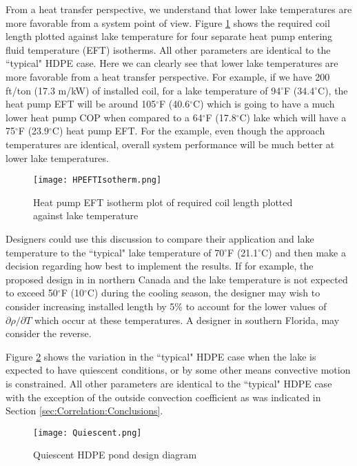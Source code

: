 From a heat transfer perspective, we understand that lower lake temperatures are more favorable from a system point of view. Figure \ref{fig:DesignTools:SpcCooling:HPEFTIsotherm} shows the required coil length plotted against lake temperature for four separate heat pump entering fluid temperature (EFT) isotherms. All other parameters are identical to the ``typical" HDPE case. Here we can clearly see that lower lake temperatures are more favorable from a heat transfer perspective. For example, if we have 200 ft/ton (17.3 m/kW) of installed coil, for a lake temperature of 94$^\circ$F (34.4$^\circ$C), the heat pump EFT will be around 105$^\circ$F (40.6$^\circ$C) which is going to have a much lower heat pump COP when compared to a 64$^\circ$F (17.8$^\circ$C) lake which will have a 75$^\circ$F (23.9$^\circ$C) heat pump EFT. For the example, even though the approach temperatures are identical, overall system performance will be much better at lower lake temperatures.

	\begin{figure}
		\centering
		\texttt{[image: HPEFTIsotherm.png]}
		\caption[Heat pump EFT isotherm plot]{Heat pump EFT isotherm plot of required coil length plotted against lake temperature}
		\label{fig:DesignTools:SpcCooling:HPEFTIsotherm}
	\end{figure}
	
Designers could use this discussion to compare their application and lake temperature to the ``typical" lake temperature of 70$^\circ$F (21.1$^\circ$C) and then make a decision regarding how best to implement the results. If for example, the proposed design in in northern Canada and the lake temperature is not expected to exceed 50$^\circ$F (10$^\circ$C) during the cooling season, the designer may wish to consider increasing installed length by 5\% to account for the lower values of $\partial\rho/\partial T$ which occur at these temperatures. A designer in southern Florida, may consider the reverse.

Figure \ref{fig:DesignTools:SpcCooling:Quiescent} shows the variation in the ``typical" HDPE case when the lake is expected to have quiescent conditions, or by some other means convective motion is constrained. All other parameters are identical to the ``typical" HDPE case with the exception of the outside convection coefficient as was indicated in Section \ref{sec:Correlation:Conclusions}.
	
	\begin{figure}
		\centering
		\texttt{[image: Quiescent.png]}
		\caption{Quiescent HDPE pond design diagram}
		\label{fig:DesignTools:SpcCooling:Quiescent}
	\end{figure}
	
